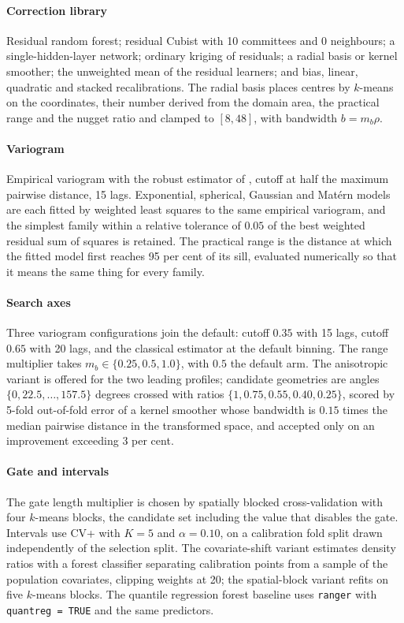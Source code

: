 \documentclass[preprint,12pt,authoryear]{elsarticle}
\begin{document}
\paragraph{Correction library} Residual random forest; residual Cubist with 10
committees and 0 neighbours; a single-hidden-layer network; ordinary kriging of
residuals; a radial basis or kernel smoother; the unweighted mean of the
residual learners; and bias, linear, quadratic and stacked recalibrations. The
radial basis places centres by $k$-means on the coordinates, their number
derived from the domain area, the practical range and the nugget ratio and
clamped to $[8,48]$, with bandwidth $b=m_b\rho$.

\paragraph{Variogram} Empirical variogram with the robust estimator of
\citet{cressie1980}, cutoff at half the maximum pairwise distance, 15 lags.
Exponential, spherical, Gaussian and Mat\'ern models are each fitted by weighted
least squares to the same empirical variogram, and the simplest family within a
relative tolerance of $0.05$ of the best weighted residual sum of squares is
retained. The practical range is the distance at which the fitted model first
reaches 95 per cent of its sill, evaluated numerically so that it means the same
thing for every family.

\paragraph{Search axes} Three variogram configurations join the default: cutoff
$0.35$ with 15 lags, cutoff $0.65$ with 20 lags, and the classical
\citet{matheron1963} estimator at the default binning. The range multiplier
takes $m_b \in \{0.25,0.5,1.0\}$, with $0.5$ the default arm. The anisotropic
variant is offered for the two leading profiles; candidate geometries are angles
$\{0,22.5,\dots,157.5\}$ degrees crossed with ratios
$\{1,0.75,0.55,0.40,0.25\}$, scored by 5-fold out-of-fold error of a kernel
smoother whose bandwidth is $0.15$ times the median pairwise distance in the
transformed space, and accepted only on an improvement exceeding 3 per cent.

\paragraph{Gate and intervals} The gate length multiplier is chosen by spatially
blocked cross-validation with four $k$-means blocks, the candidate set including
the value that disables the gate. Intervals use CV+ with $K=5$ and
$\alpha=0.10$, on a calibration fold split drawn independently of the selection
split. The covariate-shift variant estimates density ratios with a forest
classifier separating calibration points from a sample of the population
covariates, clipping weights at 20; the spatial-block variant refits on five
$k$-means blocks. The quantile regression forest baseline uses \texttt{ranger}
with \texttt{quantreg = TRUE} and the same predictors.
\end{document}
